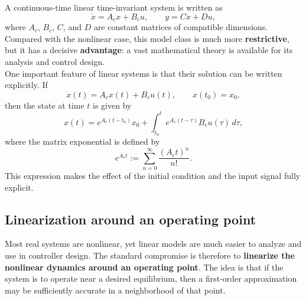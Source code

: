 A continuous-time linear time-invariant system is written as
\[
\dot{x} = A_c x + B_c u, \qquad y = Cx + Du,
\]
where $A_c$, $B_c$, $C$, and $D$ are constant matrices of compatible dimensions. Compared with the nonlinear case, this model class is much more \textbf{restrictive}, but it has a decisive \textbf{advantage}: a vast mathematical theory is available for its analysis and control design.\\
One important feature of linear systems is that their solution can be written explicitly. If
\[
\dot{x}(t) = A_c x(t) + B_c u(t), \qquad x(t_0)=x_0,
\]
then the state at time $t$ is given by
\[
x(t) = e^{A_c(t-t_0)}x_0 + \int_{t_0}^{t} e^{A_c(t-\tau)} B_c u(\tau)\, d\tau,
\]
where the matrix exponential is defined by
\[
e^{A_c t} := \sum_{n=0}^{\infty}\frac{(A_c t)^n}{n!}.
\]
This expression makes the effect of the initial condition and the input signal fully explicit.

\subsection{Linearization around an operating point}

Most real systems are nonlinear, yet linear models are much easier to analyze and use in controller design. The standard compromise is therefore to \textbf{linearize the nonlinear dynamics around an operating point}. The idea is that if the system is to operate near a desired equilibrium, then a first-order approximation may be sufficiently accurate in a neighborhood of that point.\\

